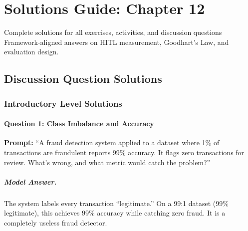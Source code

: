 
\chapter{Solutions Guide: Chapter 12}
\label{ch:solutions-ch12}

\begin{chapterquote}{Complete solutions for all exercises, activities, and discussion questions}
Framework-aligned answers on HITL measurement, Goodhart's Law, and evaluation design.
\end{chapterquote}

\section{Discussion Question Solutions}

\subsection{Introductory Level Solutions}

\subsubsection{Question 1: Class Imbalance and Accuracy}

\textbf{Prompt:} ``A fraud detection system applied to a dataset where 1\% of transactions are fraudulent reports 99\% accuracy. It flags zero transactions for review. What's wrong, and what metric would catch the problem?''

\paragraph{Model Answer.}

The system labels every transaction ``legitimate.'' On a 99:1 dataset (99\% legitimate), this achieves 99\% accuracy while catching zero fraud. It is a completely useless fraud detector.

